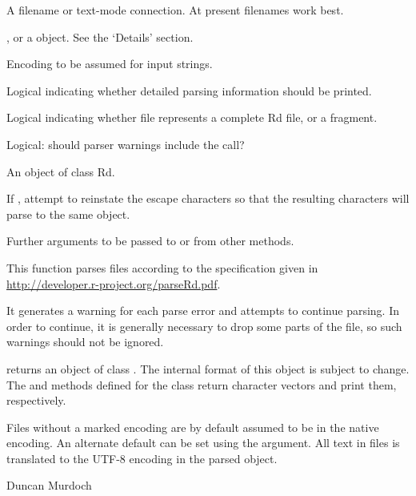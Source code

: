 %
\begin{Arguments}
\begin{ldescription}
\item[\code{file}] A filename or text-mode connection.  At present filenames
work best.
\item[\code{srcfile}] , or a  object.  See the
`Details' section.
\item[\code{encoding}] Encoding to be assumed for input strings.
\item[\code{verbose}] Logical indicating whether detailed parsing
information should be printed.
\item[\code{fragment}] Logical indicating whether file represents a complete
Rd file, or a fragment.
\item[\code{warningCalls}] Logical: should parser warnings include the call?
\item[\code{x}] An object of class Rd.
\item[\code{deparse}] If , attempt to reinstate the escape characters
so that the resulting characters will parse to the same object.
\item[\code{...}] Further arguments to be passed to or from other methods.
\end{ldescription}
\end{Arguments}
%
\begin{Details}\relax
This function parses  files according to the specification given
in \url{http://developer.r-project.org/parseRd.pdf}.

It generates a warning for each parse error and attempts to continue
parsing.  In order to continue, it is generally necessary to drop some
parts of the file, so such warnings should not be ignored.
\end{Details}
%
\begin{Value}
 returns an object of class .  The
internal format of this object is subject to change.  The
 and  methods defined for the
class return character vectors and print them, respectively.

Files without a marked encoding are by default assumed to be in the
native encoding.  An alternate default can be set using the
 argument.  All text in files is translated to the
UTF-8 encoding in the parsed object.
\end{Value}
%
\begin{Author}\relax
 Duncan Murdoch 
\end{Author}
